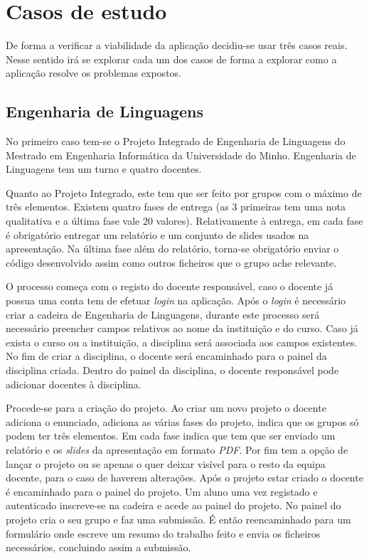 \section{Casos de estudo}
De forma a verificar a viabilidade da aplicação decidiu-se usar três casos reais. Nesse sentido irá se explorar cada um dos casos de forma a explorar como a aplicação resolve os problemas expostos.

\subsection{Engenharia de Linguagens}
\label{sub:engenharia_de_linguagens}

No primeiro caso tem-se o Projeto Integrado de Engenharia de Linguagens do Mestrado em Engenharia Informática da Universidade do Minho.
Engenharia de Linguagens tem um turno e quatro docentes.

Quanto ao Projeto Integrado, este tem que ser feito por grupos com o máximo de três elementos. Existem quatro fases de entrega (as 3 primeiras tem uma nota qualitativa e a última fase vale 20 valores). Relativamente à entrega, em cada fase é obrigatório entregar um relatório e um conjunto de slides usados na apresentação. Na última fase além do relatório, torna-se obrigatório enviar o código desenvolvido assim como outros ficheiros que o grupo ache relevante.

O processo começa com o registo do docente responsável, caso o docente já possua uma conta tem de efetuar \emph{login} na aplicação. Após o \emph{login} é necessário criar a cadeira de Engenharia de Linguagens, durante este processo será necessário preencher campos relativos ao nome da instituição e do curso. Caso já  exista o curso ou a instituição, a disciplina será associada aos campos existentes. No fim de criar a disciplina, o docente será encaminhado para o painel da disciplina criada. Dentro do painel da disciplina, o docente responsável pode adicionar docentes à disciplina.

Procede-se para a criação do projeto. Ao criar um novo projeto o docente adiciona o enunciado, adiciona as várias fases do projeto, indica que os grupos só podem ter três elementos. Em cada fase indica que tem que ser enviado um relatório e os \emph{slides} da apresentação em formato \emph{PDF}. Por fim tem a opção de lançar o projeto ou se apenas o quer deixar visível para o resto da equipa docente, para o caso de haverem alterações. Após o projeto estar criado o docente é encaminhado para o painel do projeto.
Um aluno uma vez registado e autenticado inscreve-se na cadeira e acede ao painel do projeto. No painel do projeto cria o seu grupo e faz uma submissão. É então reencaminhado para um formulário onde escreve um resumo do trabalho feito e envia os ficheiros necessários, concluindo assim a submissão.

